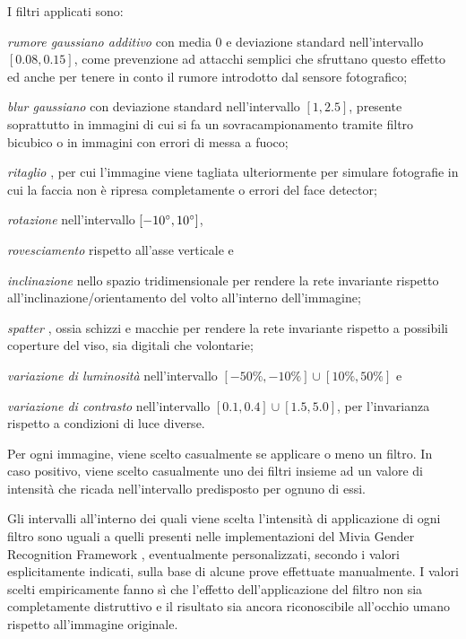 I filtri applicati sono:
\begin{enumerate*}[label={\alph*)}]
\item \emph{rumore gaussiano additivo} con media 0 e deviazione standard nell'intervallo $[0.08, 0.15]$, come prevenzione ad attacchi semplici che sfruttano questo effetto ed anche per tenere in conto il rumore introdotto dal sensore fotografico;
\item \emph{blur gaussiano} con deviazione standard nell'intervallo $[1, 2.5]$, presente soprattutto in immagini di cui si fa un sovracampionamento tramite filtro bicubico o in immagini con errori di messa a fuoco;
\item \emph{ritaglio} \cite{miviagender}, per cui l'immagine viene tagliata ulteriormente per simulare fotografie in cui la faccia non è ripresa completamente o errori del face detector;
\item \emph{rotazione} nell'intervallo $[-10 \degree, 10 \degree ]$, \item \emph{rovesciamento} rispetto all'asse verticale e \item \emph{inclinazione} \cite{miviagender} nello spazio tridimensionale per rendere la rete invariante rispetto all'inclinazione/orientamento del volto all'interno dell'immagine;
\item \emph{spatter} \cite{miviagender}, ossia schizzi e macchie per rendere la rete invariante rispetto a possibili coperture del viso, sia digitali che volontarie;
\item \emph{variazione di luminosità} nell'intervallo $[-50\%, -10\%] \cup [10\%, 50\%]$ e \item \emph{variazione di contrasto} nell'intervallo $[0.1, 0.4] \cup [1.5, 5.0]$, per l'invarianza rispetto a condizioni di luce diverse.
\end{enumerate*}
Per ogni immagine, viene scelto casualmente se applicare o meno un filtro. In caso positivo, viene scelto casualmente uno dei filtri insieme ad un valore di intensità che ricada nell'intervallo predisposto per ognuno di essi.

Gli intervalli all'interno dei quali viene scelta l'intensità di applicazione di ogni filtro sono uguali a quelli presenti nelle implementazioni del Mivia Gender Recognition Framework \cite{miviagender}, eventualmente personalizzati, secondo i valori esplicitamente indicati, sulla base di alcune prove effettuate manualmente.
I valori scelti empiricamente fanno sì che l'effetto dell'applicazione del filtro non sia completamente distruttivo e il risultato sia ancora riconoscibile all'occhio umano rispetto all'immagine originale.

